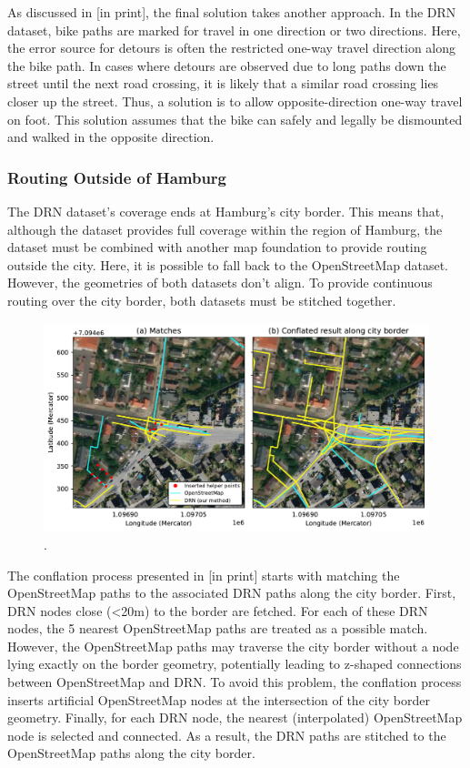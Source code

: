 As discussed in [in print], the final solution takes another approach. In the DRN dataset, bike paths are marked for travel in one direction or two directions. Here, the error source for detours is often the restricted one-way travel direction along the bike path. In cases where detours are observed due to long paths down the street until the next road crossing, it is likely that a similar road crossing lies closer up the street. Thus, a solution is to allow opposite-direction one-way travel on foot. This solution assumes that the bike can safely and legally be dismounted and walked in the opposite direction.

\subsubsection{Routing Outside of Hamburg}

The DRN dataset's coverage ends at Hamburg's city border. This means that, although the dataset provides full coverage within the region of Hamburg, the dataset must be combined with another map foundation to provide routing outside the city. Here, it is possible to fall back to the OpenStreetMap dataset. However, the geometries of both datasets don't align. To provide continuous routing over the city border, both datasets must be stitched together. 

\begin{figure}[htbp]
\centering
\includegraphics[width=\linewidth]{images/routing-drn-osm-border.pdf}
\caption{.}
\label{fig:}
\end{figure}

The conflation process presented in [in print] starts with matching the OpenStreetMap paths to the associated DRN paths along the city border. First, DRN nodes close (<20m) to the border are fetched. For each of these DRN nodes, the 5 nearest OpenStreetMap paths are treated as a possible match. However, the OpenStreetMap paths may traverse the city border without a node lying exactly on the border geometry, potentially leading to z-shaped connections between OpenStreetMap and DRN. To avoid this problem, the conflation process inserts artificial OpenStreetMap nodes at the intersection of the city border geometry. Finally, for each DRN node, the nearest (interpolated) OpenStreetMap node is selected and connected. As a result, the DRN paths are stitched to the OpenStreetMap paths along the city border.

